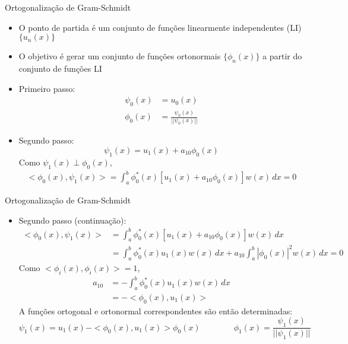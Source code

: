      \begin{slide}[toc=]{Ortogonalização de Gram-Schmidt}
	     \begin{itemize}
		     \item O ponto de partida é um conjunto de funções linearmente independentes (LI) $\{ u_n(x) \}$
		     \item O objetivo é gerar um conjunto de funções ortonormais $\{\phi_n(x)\}$ a partir do conjunto de funções LI
		     \item Primeiro passo:
			     \begin{align*}
				     \psi_0(x) &= u_0(x)\\
				     \phi_0(x) &= \frac{\psi_0(x)}{||\psi_0(x)||}
			     \end{align*}
		     \item Segundo passo:
			     \begin{equation*}
				     \psi_1(x) = u_1(x)+a_{10}\phi_0(x)
  			     \end{equation*}
			     Como $\psi_1(x)\perp \phi_0(x)$,
			     \begin{align*}
				     <\phi_0(x),\psi_1(x)> = \int_a^b \phi_0^\ast (x) \left [u_1(x)+a_{10}\phi_0(x) \right ] w(x)\,dx = 0
			     \end{align*}

	     \end{itemize}
     \end{slide}

     \begin{slide}[toc=]{Ortogonalização de Gram-Schmidt}
	     \begin{itemize}
		     \item Segundo passo (continuação):
			     \begin{align*}
				     <\phi_0(x),\psi_1(x)> &= \int_a^b \phi_0^\ast (x) \left [u_1(x)+a_{10}\phi_0(x) \right ] w(x)\,dx\\
							   &= \int_a^b \phi_0^\ast (x) u_1(x)w(x)\,dx + a_{10}\int_a^b |\phi_0(x)|^2w(x)\,dx = 0
			     \end{align*}
			     Como $<\phi_i(x),\phi_i(x)> = 1$,
			     \begin{align*}
				     a_{10} &= -\int_a^b\phi_0^\ast(x) u_1(x) w(x)\,dx\\
				            &= -<\phi_0(x),u_1(x)>
			     \end{align*}
			     A funções ortogonal e ortonormal correspondentes são então determinadas:
			     \begin{equation*}
				     \psi_1(x) = u_1(x) - <\phi_0(x),u_1(x)>\phi_0(x) \qquad\qquad \phi_1(x) = \frac{\psi_1(x)}{||\psi_1(x)||}
			     \end{equation*}
	     \end{itemize}
     \end{slide}
     
